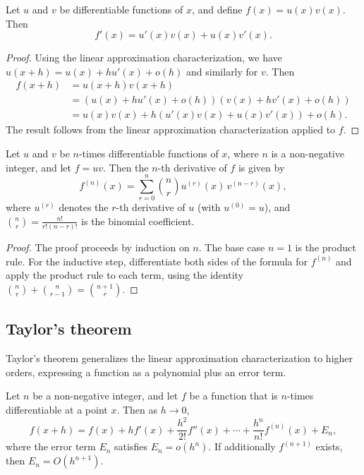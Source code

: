 \documentclass[a4paper]{article}
\begin{document}
\begin{thm}
  Let $u$ and $v$ be differentiable functions of $x$, and define $f(x) = u(x)v(x)$. Then
  \[
    f'(x) = u'(x)v(x) + u(x)v'(x).
  \]
\end{thm}

\begin{proof}
  Using the linear approximation characterization, we have $u(x+h) = u(x) + hu'(x) + o(h)$ and similarly for $v$. Then
  \begin{align*}
    f(x+h) &= u(x+h)v(x+h) \\
    &= (u(x) + hu'(x) + o(h))(v(x) + hv'(x) + o(h)) \\
    &= u(x)v(x) + h(u'(x)v(x) + u(x)v'(x)) + o(h).
  \end{align*}
  The result follows from the linear approximation characterization applied to $f$.
\end{proof}

\begin{thm}
  Let $u$ and $v$ be $n$-times differentiable functions of $x$, where $n$ is a non-negative integer, and let $f = uv$. Then the $n$-th derivative of $f$ is given by
  \[
    f^{(n)}(x) = \sum_{r = 0}^n \binom{n}{r}u^{(r)}(x)\,v^{(n - r)}(x),
  \]
  where $u^{(r)}$ denotes the $r$-th derivative of $u$ (with $u^{(0)} = u$), and $\binom{n}{r} = \frac{n!}{r!(n-r)!}$ is the binomial coefficient.
\end{thm}

\begin{proof}
  The proof proceeds by induction on $n$. The base case $n=1$ is the product rule. For the inductive step, differentiate both sides of the formula for $f^{(n)}$ and apply the product rule to each term, using the identity $\binom{n}{r} + \binom{n}{r-1} = \binom{n+1}{r}$.
\end{proof}

\subsection{Taylor's theorem}
Taylor's theorem generalizes the linear approximation characterization to higher orders, expressing a function as a polynomial plus an error term.

\begin{thm}
  Let $n$ be a non-negative integer, and let $f$ be a function that is $n$-times differentiable at a point $x$. Then as $h \to 0$,
  \[
    f(x + h) = f(x) + hf'(x) + \frac{h^2}{2!}f''(x) + \cdots + \frac{h^n}{n!}f^{(n)}(x) + E_n,
  \]
  where the error term $E_n$ satisfies $E_n = o(h^{n})$. If additionally $f^{(n+1)}$ exists, then $E_n = O(h^{n+1})$.
\end{thm}
\end{document}
